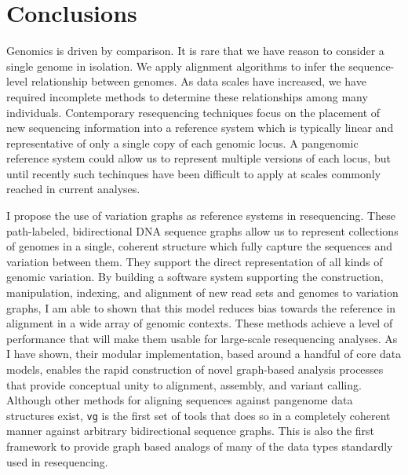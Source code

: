 %
\chapter{Conclusions}

\ifpdf
    \graphicspath{{Chapter3/Figs/Raster/}{Chapter3/Figs/PDF/}{Chapter3/Figs/}}
\else
    \graphicspath{{Chapter3/Figs/Vector/}{Chapter3/Figs/}}
\fi

Genomics is driven by comparison.
It is rare that we have reason to consider a single genome in isolation.
We apply alignment algorithms to infer the sequence-level relationship between genomes.
As data scales have increased, we have required incomplete methods to determine these relationships among many individuals.
Contemporary resequencing techniques focus on the placement of new sequencing information into a reference system which is typically linear and representative of only a single copy of each genomic locus.
A pangenomic reference system could allow us to represent multiple versions of each locus, but until recently such techinques have been difficult to apply at scales commonly reached in current analyses.

I propose the use of variation graphs as reference systems in resequencing.
These path-labeled, bidirectional DNA sequence graphs allow us to represent collections of genomes in a single, coherent structure which fully capture the sequences and variation between them.
They support the direct representation of all kinds of genomic variation.
By building a software system supporting the construction, manipulation, indexing, and alignment of new read sets and genomes to variation graphs, I am able to shown that this model reduces bias towards the reference in alignment in a wide array of genomic contexts.
These methods achieve a level of performance that will make them usable for large-scale resequencing analyses.
As I have shown, their modular implementation, based around a handful of core data models, enables the rapid construction of novel graph-based analysis processes that provide conceptual unity to alignment, assembly, and variant calling.
Although other methods for aligning sequences against pangenome data structures exist, {\tt vg} is the first set of tools that does so in a completely coherent manner against arbitrary bidirectional sequence graphs.
This is also the first framework to provide graph based analogs of many of the data types standardly used in resequencing.

